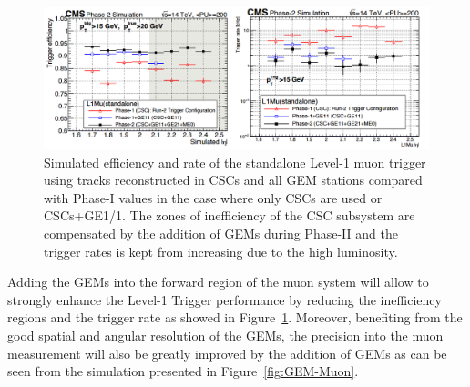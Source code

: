 	\begin{figure}[H]
		\centering
		\includegraphics[width=\linewidth]{fig/chapt3/GEM-Trigger.png}
		\caption{\label{fig:GEM-Trigger} Simulated efficiency and rate of the standalone Level-1 muon trigger using tracks reconstructed in CSCs and all GEM stations compared with Phase-I values in the case where only CSCs are used or CSCs+GE1/1. The zones of inefficiency of the CSC subsystem are compensated by the addition of GEMs during Phase-II and the trigger rates is kept from increasing due to the high luminosity.}
	\end{figure}
	
	Adding the GEMs into the forward region of the muon system will allow to strongly enhance the Level-1 Trigger performance by reducing the inefficiency regions and the trigger rate as showed in Figure~\ref{fig:GEM-Trigger}. Moreover, benefiting from the good spatial and angular resolution of the GEMs, the precision into the muon measurement will also be greatly improved by the addition of GEMs as can be seen from the simulation presented in Figure~\ref{fig:GEM-Muon}.
	
